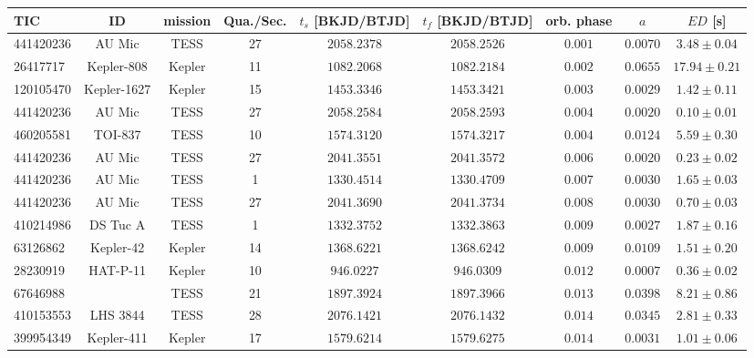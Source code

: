 \begin{tabular}{l|cccccccc}
\hline
       TIC &           ID & mission &  Qua./Sec. & $t_s$ [BKJD/BTJD] & $t_f$ [BKJD/BTJD] & orb. phase &       $a$ &          $ED$ [s] \\
\hline
 441420236 &       AU Mic &    TESS &         27 &       $2058.2378$ &       $2058.2526$ &    $0.001$ &  $0.0070$ &   $3.48 \pm 0.04$ \\
  26417717 &   Kepler-808 &  Kepler &         11 &       $1082.2068$ &       $1082.2184$ &    $0.002$ &  $0.0655$ &  $17.94 \pm 0.21$ \\
 120105470 &  Kepler-1627 &  Kepler &         15 &       $1453.3346$ &       $1453.3421$ &    $0.003$ &  $0.0029$ &   $1.42 \pm 0.11$ \\
 441420236 &       AU Mic &    TESS &         27 &       $2058.2584$ &       $2058.2593$ &    $0.004$ &  $0.0020$ &   $0.10 \pm 0.01$ \\
 460205581 &      TOI-837 &    TESS &         10 &       $1574.3120$ &       $1574.3217$ &    $0.004$ &  $0.0124$ &   $5.59 \pm 0.30$ \\
 441420236 &       AU Mic &    TESS &         27 &       $2041.3551$ &       $2041.3572$ &    $0.006$ &  $0.0020$ &   $0.23 \pm 0.02$ \\
 441420236 &       AU Mic &    TESS &          1 &       $1330.4514$ &       $1330.4709$ &    $0.007$ &  $0.0030$ &   $1.65 \pm 0.03$ \\
 441420236 &       AU Mic &    TESS &         27 &       $2041.3690$ &       $2041.3734$ &    $0.008$ &  $0.0030$ &   $0.70 \pm 0.03$ \\
 410214986 &     DS Tuc A &    TESS &          1 &       $1332.3752$ &       $1332.3863$ &    $0.009$ &  $0.0027$ &   $1.87 \pm 0.16$ \\
  63126862 &    Kepler-42 &  Kepler &         14 &       $1368.6221$ &       $1368.6242$ &    $0.009$ &  $0.0109$ &   $1.51 \pm 0.20$ \\
  28230919 &     HAT-P-11 &  Kepler &         10 &        $946.0227$ &        $946.0309$ &    $0.012$ &  $0.0007$ &   $0.36 \pm 0.02$ \\
  67646988 &              &    TESS &         21 &       $1897.3924$ &       $1897.3966$ &    $0.013$ &  $0.0398$ &   $8.21 \pm 0.86$ \\
 410153553 &     LHS 3844 &    TESS &         28 &       $2076.1421$ &       $2076.1432$ &    $0.014$ &  $0.0345$ &   $2.81 \pm 0.33$ \\
 399954349 &   Kepler-411 &  Kepler &         17 &       $1579.6214$ &       $1579.6275$ &    $0.014$ &  $0.0031$ &   $1.01 \pm 0.06$ \\

\end{tabular}
